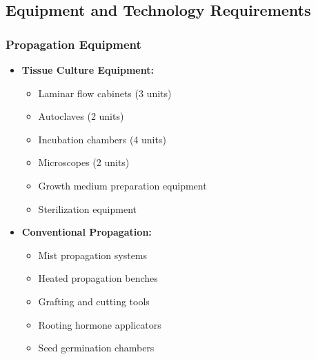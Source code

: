 \subsection{Equipment and Technology Requirements}

\subsubsection{Propagation Equipment}
\begin{itemize}
    \item \textbf{Tissue Culture Equipment:}
    \begin{itemize}
        \item Laminar flow cabinets (3 units)
        \item Autoclaves (2 units)
        \item Incubation chambers (4 units)
        \item Microscopes (2 units)
        \item Growth medium preparation equipment
        \item Sterilization equipment
    \end{itemize}
    
    \item \textbf{Conventional Propagation:}
    \begin{itemize}
        \item Mist propagation systems
        \item Heated propagation benches
        \item Grafting and cutting tools
        \item Rooting hormone applicators
        \item Seed germination chambers
    \end{itemize}
\end{itemize}

